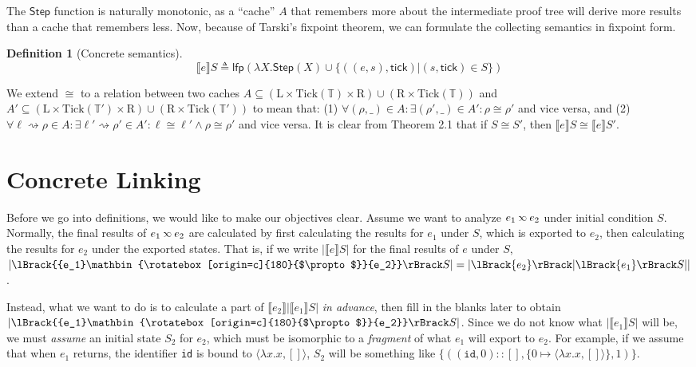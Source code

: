 \documentclass[acmsmall,review]{acmart}\settopmatter{printfolios=true,printccs=false,printacmref=false}
\theoremstyle{definition}
\newtheorem{definition}{Definition}[section]
\newcommand*{\cons}{::}
\newcommand*{\Time}{\mathbb{T}}
\newcommand*{\Left}{\text{L}}
\newcommand*{\Right}{\text{R}}
\newcommand*{\Tick}{\text{Tick}}
\newcommand*{\semlink}{\mathbin{\rotatebox[origin=c]{180}{$\propto$}}}
\newcommand*{\link}[2]{{#1}\semlink{#2}}
\newcommand*{\sembracket}[1]{\lBrack{#1}\rBrack}
\newcommand*{\tick}{\mathsf{tick}}
\begin{document}
The $\mathsf{Step}$ function is naturally monotonic, as a ``cache'' $A$ that remembers more about the intermediate proof tree will derive more results than a cache that remembers less.
Now, because of Tarski's fixpoint theorem, we can formulate the collecting semantics in fixpoint form.
\begin{definition}[Concrete semantics]
  \[
    \sembracket{e}S\triangleq\mathsf{lfp}(\lambda X.\mathsf{Step}(X)\cup\{((e,s),\tick)|(s,\tick)\in S\})
  \]
\end{definition}
We extend $\cong$ to a relation between two caches $A\subseteq(\Left\times\Tick(\Time)\times\Right )\cup(\Right\times\Tick(\Time))$ and $A'\subseteq(\Left\times\Tick(\Time')\times\Right )\cup(\Right\times\Tick(\Time'))$ to mean that: (1) $\forall(\rho,\_)\in A:\exists(\rho',\_)\in A':\rho\cong\rho'$ and vice versa, and (2) $\forall\ell\rightsquigarrow\rho\in A:\exists\ell'\rightsquigarrow\rho'\in A':\ell\cong\ell'\wedge\rho\cong\rho'$ and vice versa.
It is clear from Theorem 2.1 that if $S\cong S'$, then $\sembracket{e}S\cong\sembracket{e}S'$.

\section{Concrete Linking}

Before we go into definitions, we would like to make our objectives clear.
Assume we want to analyze $\link{e_1}{e_2}$ under initial condition $S$.
Normally, the final results of $\link{e_1}{e_2}$ are calculated by first calculating the results for $e_1$ under $S$, which is exported to $e_2$, then calculating the results for $e_2$ under the exported states.
That is, if we write $|\sembracket{e}S|$ for the final results of $e$ under $S$, $|\sembracket{\link{e_1}{e_2}}S|=|\sembracket{e_2}|\sembracket{e_1}S||$.

Instead, what we want to do is to calculate a part of $\sembracket{e_2}|\sembracket{e_1}S|$ \emph{in advance}, then fill in the blanks later to obtain $|\sembracket{\link{e_1}{e_2}}S|$.
Since we do not know what $|\sembracket{e_1}S|$ will be, we must \emph{assume} an initial state $S_2$ for $e_2$, which must be isomorphic to a \emph{fragment} of what $e_1$ will export to $e_2$.
For example, if we assume that when $e_1$ returns, the identifier \texttt{id} is bound to $\langle\lambda x.x,[]\rangle$, $S_2$ will be something like $\{((\mathtt{id},0)\cons[],\{0\mapsto\langle\lambda x.x,[]\rangle\},1)\}$.
\end{document}
